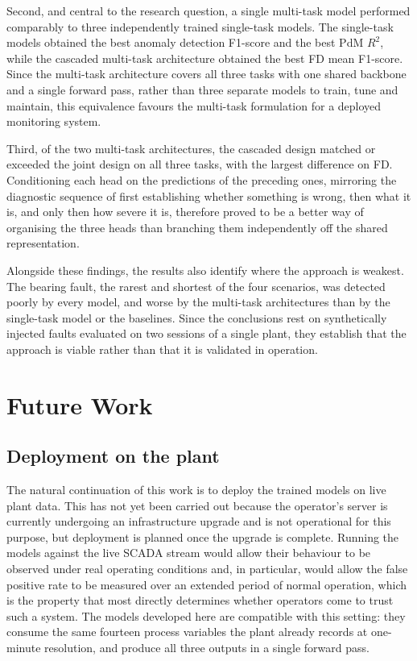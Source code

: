 Second, and central to the research question, a single multi-task model performed comparably to three
independently trained single-task models. The single-task models obtained the best anomaly detection
F1-score and the best PdM $R^2$, while the cascaded multi-task
architecture obtained the best FD mean F1-score. Since the multi-task architecture covers all three tasks with one shared backbone and a
single forward pass, rather than three separate models to train, tune and maintain, this equivalence
favours the multi-task formulation for a deployed monitoring system.

Third, of the two multi-task architectures, the cascaded design matched or exceeded the joint design on
all three tasks, with the largest difference on FD. Conditioning each head on the predictions
of the preceding ones, mirroring the diagnostic sequence of first establishing whether something is wrong,
then what it is, and only then how severe it is, therefore proved to be a better way of organising the
three heads than branching them independently off the shared representation.

Alongside these findings, the results also identify where the approach is weakest. The bearing fault, the
rarest and shortest of the four scenarios, was detected poorly by every model, and worse by the multi-task
architectures than by the single-task model or the baselines. Since the conclusions rest on synthetically injected faults
evaluated on two sessions of a single plant, they establish that the approach is viable rather than that
it is validated in operation.

\section{Future Work} \label{sec:future_work}

\subsection*{Deployment on the plant}

The natural continuation of this work is to deploy the trained models on live plant data. This has not yet
been carried out because the operator's server is currently undergoing an infrastructure upgrade and is
not operational for this purpose, but deployment is planned once the upgrade is complete. Running the
models against the live SCADA stream would allow their behaviour to be observed under real operating
conditions and, in particular, would allow the false positive rate to be measured over an extended period
of normal operation, which is the property that most directly determines whether operators come to trust
such a system. The models developed here are compatible with this setting: they consume the same fourteen
process variables the plant already records at one-minute resolution, and produce all three outputs in a
single forward pass.

